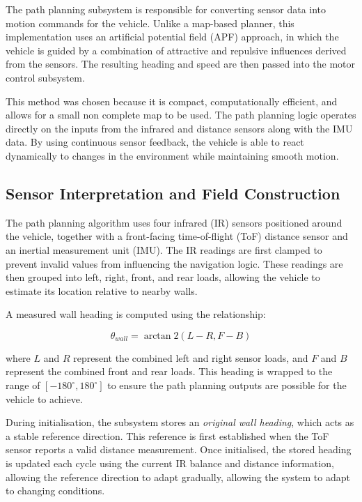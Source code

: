 The path planning subsystem is responsible for converting sensor data into motion commands for the vehicle. Unlike a map-based planner, this implementation uses an artificial potential field (APF) approach, in which the vehicle is guided by a combination of attractive and repulsive influences derived from the sensors. The resulting heading and speed are then passed into the motor control subsystem.

This method was chosen because it is compact, computationally efficient, and allows for a small non complete map to be used. The path planning logic operates directly on the inputs from the infrared and distance sensors along with the IMU data. By using continuous sensor feedback, the vehicle is able to react dynamically to changes in the environment while maintaining smooth motion.

\subsection{Sensor Interpretation and Field Construction}

The path planning algorithm uses four infrared (IR) sensors positioned around the vehicle, together with a front-facing time-of-flight (ToF) distance sensor and an inertial measurement unit (IMU). The IR readings are first clamped to prevent invalid values from influencing the navigation logic. These readings are then grouped into left, right, front, and rear loads, allowing the vehicle to estimate its location relative to nearby walls.

A measured wall heading is computed using the relationship:

\[\theta_{wall} = \arctan2(L - R, F - B)\]

where $L$ and $R$ represent the combined left and right sensor loads, and $F$ and $B$ represent the combined front and rear loads. This heading is wrapped to the range of $[-180^\circ, 180^\circ]$ to ensure the path planning outputs are possible for the vehicle to achieve.


During initialisation, the subsystem stores an \emph{original wall heading}, which acts as a stable reference direction. This reference is first established when the ToF sensor reports a valid distance measurement. Once initialised, the stored heading is updated each cycle using the current IR balance and distance information, allowing the reference direction to adapt gradually, allowing the system to adapt to changing conditions.
